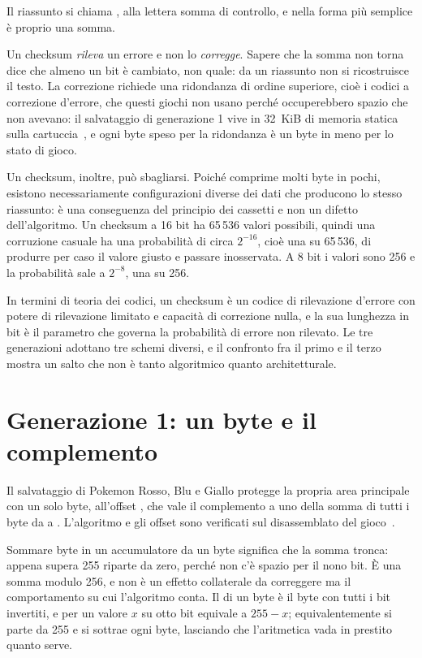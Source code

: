 Il riassunto si chiama , alla lettera somma di controllo, e nella forma più
semplice è proprio una somma.

Un checksum \emph{rileva} un errore e non lo \emph{corregge}. Sapere che la somma non
torna dice che almeno un bit è cambiato, non quale: da un riassunto non si ricostruisce il
testo. La correzione richiede una ridondanza di ordine superiore, cioè i codici a
correzione d'errore, che questi giochi non usano perché occuperebbero spazio che non
avevano: il salvataggio di generazione 1 vive in \SI{32}{KiB} di memoria statica sulla
cartuccia~\cite{pandocs}, e ogni byte speso per la ridondanza è un byte in meno per lo
stato di gioco.

Un checksum, inoltre, può sbagliarsi. Poiché comprime molti byte in pochi, esistono
necessariamente configurazioni diverse dei dati che producono lo stesso riassunto: è una
conseguenza del principio dei cassetti e non un difetto dell'algoritmo. Un checksum a 16
bit ha 65\,536 valori possibili, quindi una corruzione casuale ha una probabilità di circa
$2^{-16}$, cioè una su 65\,536, di produrre per caso il valore giusto e passare
inosservata. A 8 bit i valori sono 256 e la probabilità sale a $2^{-8}$, una su 256.

In termini di teoria dei codici, un checksum è un codice di rilevazione d'errore con
potere di rilevazione limitato e capacità di correzione nulla, e la sua lunghezza in bit è
il parametro che governa la probabilità di errore non rilevato. Le tre generazioni
adottano tre schemi diversi, e il confronto fra il primo e il terzo mostra un salto che
non è tanto algoritmico quanto architetturale.

\section{Generazione 1: un byte e il complemento}

Il salvataggio di Pokemon Rosso, Blu e Giallo protegge la propria area principale con un
solo byte, all'offset , che vale il complemento a uno della somma di tutti i byte
da  a . L'algoritmo e gli offset sono verificati sul disassemblato del
gioco~\cite{pokered}.

Sommare byte in un accumulatore da un byte significa che la somma tronca: appena supera
255 riparte da zero, perché non c'è spazio per il nono bit. È una somma modulo 256, e non
è un effetto collaterale da correggere ma il comportamento su cui l'algoritmo conta. Il
 di un byte è il byte con tutti i bit invertiti, e per un valore
$x$ su otto bit equivale a $255 - x$; equivalentemente si parte da 255 e si sottrae ogni
byte, lasciando che l'aritmetica vada in prestito quanto serve.

